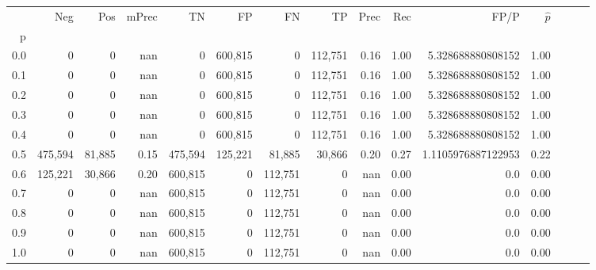 \begin{tabular}{rrrrrrrrrrrrrrr}
\toprule
{} &      Neg &     Pos & mPrec &       TN &       FP &       FN &       TP &  Prec &   Rec &                FP/P & $\hat{p}$ \\
p   &          &         &       &          &          &          &          &       &       &                     &           \\
\midrule
0.0 &        0 &       0 &   nan &        0 &  600,815 &        0 &  112,751 &  0.16 &  1.00 &   5.328688880808152 &      1.00 \\
0.1 &        0 &       0 &   nan &        0 &  600,815 &        0 &  112,751 &  0.16 &  1.00 &   5.328688880808152 &      1.00 \\
0.2 &        0 &       0 &   nan &        0 &  600,815 &        0 &  112,751 &  0.16 &  1.00 &   5.328688880808152 &      1.00 \\
0.3 &        0 &       0 &   nan &        0 &  600,815 &        0 &  112,751 &  0.16 &  1.00 &   5.328688880808152 &      1.00 \\
0.4 &        0 &       0 &   nan &        0 &  600,815 &        0 &  112,751 &  0.16 &  1.00 &   5.328688880808152 &      1.00 \\
0.5 &  475,594 &  81,885 &  0.15 &  475,594 &  125,221 &   81,885 &   30,866 &  0.20 &  0.27 &  1.1105976887122953 &      0.22 \\
0.6 &  125,221 &  30,866 &  0.20 &  600,815 &        0 &  112,751 &        0 &   nan &  0.00 &                 0.0 &      0.00 \\
0.7 &        0 &       0 &   nan &  600,815 &        0 &  112,751 &        0 &   nan &  0.00 &                 0.0 &      0.00 \\
0.8 &        0 &       0 &   nan &  600,815 &        0 &  112,751 &        0 &   nan &  0.00 &                 0.0 &      0.00 \\
0.9 &        0 &       0 &   nan &  600,815 &        0 &  112,751 &        0 &   nan &  0.00 &                 0.0 &      0.00 \\
1.0 &        0 &       0 &   nan &  600,815 &        0 &  112,751 &        0 &   nan &  0.00 &                 0.0 &      0.00 \\
\bottomrule
\end{tabular}
